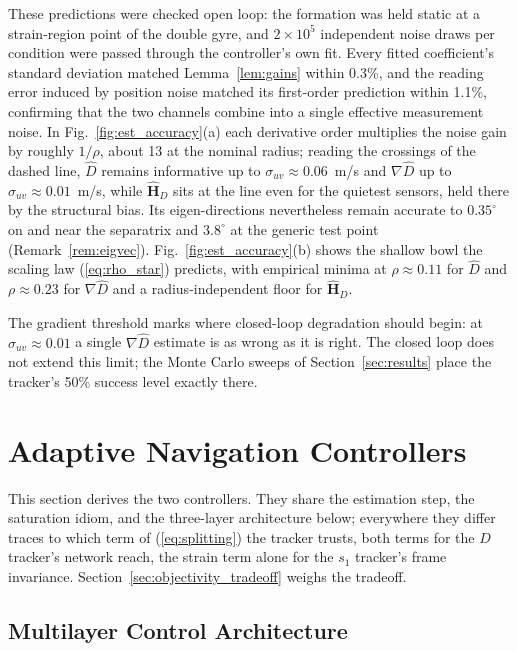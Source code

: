\documentclass[lettersize,journal]{IEEEtran}
\begin{document}
These predictions were checked open loop: the formation was held static
at a strain-region point of the double gyre, and $2 \times 10^5$
independent noise draws per condition were passed through the
controller's own fit. Every fitted coefficient's standard deviation
matched Lemma~\ref{lem:gains} within 0.3\%, and the reading error
induced by position noise matched its first-order prediction within
1.1\%, confirming that the two channels combine into a single effective
measurement noise. In Fig.~\ref{fig:est_accuracy}(a) each derivative
order multiplies the noise gain by roughly $1/\rho$, about 13 at the
nominal radius; reading the crossings of the dashed line, $\hat{D}$
remains informative up to $\sigma_{uv} \approx 0.06$~m/s and
$\nabla\hat{D}$ up to $\sigma_{uv} \approx 0.01$~m/s, while
$\hat{\mathbf{H}}_D$ sits at the line even for the quietest sensors,
held there by the structural bias. Its eigen-directions nevertheless
remain accurate to $0.35^\circ$ on and near the separatrix and
$3.8^\circ$ at the generic test point (Remark~\ref{rem:eigvec}).
Fig.~\ref{fig:est_accuracy}(b) shows the shallow bowl the scaling law
(\ref{eq:rho_star}) predicts, with empirical minima at $\rho \approx
0.11$ for $\hat{D}$ and $\rho \approx 0.23$ for $\nabla\hat{D}$ and a
radius-independent floor for $\hat{\mathbf{H}}_D$.

The gradient threshold marks where closed-loop degradation should
begin: at $\sigma_{uv} \approx 0.01$ a single $\nabla\hat{D}$ estimate
is as wrong as it is right. The closed loop does not extend this limit;
the Monte Carlo sweeps of Section~\ref{sec:results} place the tracker's
50\% success level exactly there.

\section{Adaptive Navigation Controllers}
\label{sec:controllers}

This section derives the two controllers. They share the estimation
step, the saturation idiom, and the three-layer architecture below;
everywhere they differ traces to which term of (\ref{eq:splitting}) the
tracker trusts, both terms for the $D$ tracker's network reach, the
strain term alone for the $s_1$ tracker's frame invariance.
Section~\ref{sec:objectivity_tradeoff} weighs the tradeoff.

\subsection{Multilayer Control Architecture}
\label{sec:arch}
\end{document}

